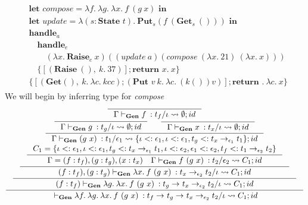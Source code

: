 \documentclass[declaration,shortabstract]{iithesis}
\theoremstyle{definition} \newtheorem{definition}{Definition}[section]
\newcommand{\gens}[6][\Gamma;\Theta]{\ensuremath{{{#1} \vdash_\textbf{Gen} {#2} \: : {#3}/{#4}} \rightsquigarrow {#5};{#6}}}
\newcommand{\arrow}[3]{{#1}\rightarrow_{#2}{#3}}
\newcommand{\lam}[1][x]{\ensuremath{\lambda #1.\:}}
\begin{document}
\begin{gather*}
\begin{aligned}
  & \textbf{let } compose = \lam[f]\lam[g]\lam f\ (g\ x) \textbf{ in}
  \\
  & \textbf{let } update = \lam[(s:\textbf{State }t)] \textbf{Put}_s (f\ (\textbf{Get}_s\ ()))\textbf{ in}
  \\
  & \textbf{handle}_a \\
  & \quad \textbf{handle}_e \\
  & \qquad (\lam \textbf{Raise}_e\ x) ((update\ a) (compose\  (\lam 21)\ (\lam x))) \\
  & \quad \{[(\textbf{Raise}\ (),\  k.\ 37)] ; \textbf{return }x.\ x\} \\
  & \{[(\textbf{Get} (),\  k.\ \lam[c] k c c) ; (\textbf{Put }v\ k.\ \lam[c] (k ()) v) ] ; \textbf{return }.\ \lam[c] x\}
\end{aligned}
\end{gather*}
We will begin by inferring type for \textit{compose}
$$
\inference{
 \inference{
  \inference{
     \inference{
          \inference{}{\gens[\Gamma]{f}{t_f}{\iota}{\emptyset}{id}}
       \\
     \inference
      {
         \inference{}{\gens[\Gamma]{g}{t_g}{\iota}{\emptyset}{id}}
         &
         \inference{}{\gens[\Gamma]{x}{t_x}{\iota}{\emptyset}{id}} 
      }{
         \gens[\Gamma]{(g\ x)}{t_1}{\epsilon_1}{\{\iota <: \epsilon_1, \iota <: \epsilon_1, t_g <: \arrow{t_x}{\epsilon_1}{t_1}\}}{id}
      } \\
      C_1 = \{
            \iota <: \epsilon_1, \iota <: \epsilon_1, t_g <: \arrow{t_x}{\epsilon_1}{t_1}, 
            \iota <: \epsilon_2, \epsilon_1 <: \epsilon_2, t_f <: \arrow{t_1}{\epsilon_2}{t_2}
        \}
     }{
     \Gamma = (f:t_f),(g:t_g),(x:t_x)
     \quad 
     \gens[\Gamma]{f\ (g\ x)}{t_2}{\epsilon_2}{C_1}{id}
    }
   }{
    \gens[(f:t_f),(g:t_g)]{\lam f\ (g\ x)}{\arrow{t_x}{\epsilon_2}{t_2}}{\iota}{C_1}{id}
   }
  }{
  \gens[(f:t_f)]{\lam[g]\lam f\ (g\ x)}{\arrow{t_g}{}{\arrow{t_x}{\epsilon_2}{t_2}}}{\iota}{C_1}{id}
  }
}{
\gens[]{\lam[f]\lam[g]\lam f\ (g\ x)}{\arrow{t_f}{}{\arrow{t_g}{}{\arrow{t_x}{\epsilon_2}{t_2}}}}{\iota}{C_1}{id}
}
$$
\end{document}
